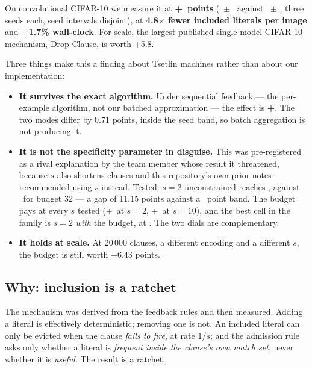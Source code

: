 On convolutional CIFAR-10 we measure it at \textbf{+\BudDelta\ points}
(\BudCap\ $\pm$ \BudCapSd\ against \BudUnc\ $\pm$ \BudUncSd, three seeds each, seed intervals
disjoint), at \textbf{4.8$\times$ fewer included literals per image} and \textbf{+1.7\% wall-clock}.
For scale, the largest published single-model CIFAR-10 mechanism, Drop Clause, is worth +5.8.


Three things make this a finding about Tsetlin machines rather than about our implementation:

\begin{itemize}
\item \textbf{It survives the exact algorithm.} Under sequential feedback --- the per-example
      algorithm, not our batched approximation --- the effect is \textbf{+\SeqDelta}. The two modes
      differ by 0.71 points, inside the seed band, so batch aggregation is not producing it.
\item \textbf{It is not the specificity parameter in disguise.} This was pre-registered as a rival
      explanation by the team member whose result it threatened, because $s$ also shortens clauses
      and this repository's own prior notes recommended using $s$ instead. Tested: $s{=}2$
      unconstrained reaches \StwoUnc, against \BudCap\ for budget 32 --- a gap of 11.15 points
      against a \SeedBand\ point band. The budget pays at every $s$ tested (+\StwoDelta\ at $s{=}2$,
      +\BudDelta\ at $s{=}10$), and the best cell in the family is $s{=}2$ \emph{with} the budget,
      at \StwoCap. The two dials are complementary.
\item \textbf{It holds at scale.} At 20\,000 clauses, a different encoding and a different $s$, the
      budget is still worth +6.43 points.
\end{itemize}

\subsection{Why: inclusion is a ratchet}
The mechanism was derived from the feedback rules and then measured. Adding a literal is effectively
deterministic; removing one is not. An included literal can only be evicted when the clause
\emph{fails to fire}, at rate $1/s$; and the admission rule asks only whether a literal is
\emph{frequent inside the clause's own match set}, never whether it is \emph{useful}. The result is a
ratchet.

